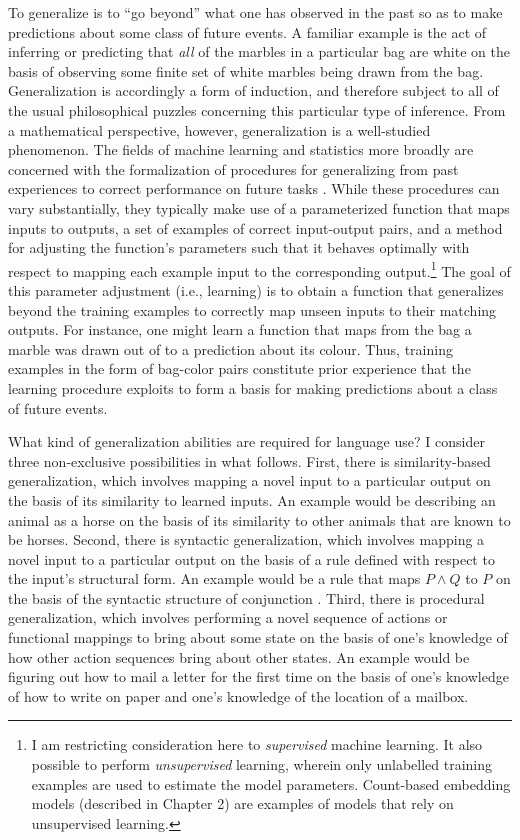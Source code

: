 To generalize is to ``go beyond'' what one has observed in the past so as to make predictions about some class of future events. A familiar example is the act of inferring or predicting that \textit{all} of the marbles in a particular bag are white on the basis of observing some finite set of white marbles being drawn from the bag. Generalization is accordingly a form of induction, and therefore subject to all of the usual philosophical puzzles concerning this particular type of inference. From a mathematical perspective, however, generalization is a well-studied phenomenon. The fields of machine learning and statistics more broadly are concerned with the formalization of procedures for generalizing from past experiences to correct performance on future tasks \citep[][p. 6]{LiangPotts:2015}. While these procedures can vary substantially, they typically make use of a parameterized function that maps inputs to outputs, a set of examples of correct input-output pairs, and a method for adjusting the function's parameters such that it behaves optimally with respect to mapping each example input to the corresponding output.\footnote{I am restricting consideration here to \textit{supervised} machine learning. It also possible to perform \textit{unsupervised} learning, wherein only unlabelled training examples are used to estimate the model parameters. Count-based embedding models (described in Chapter 2) are examples of models that rely on unsupervised learning.} The goal of this parameter adjustment (i.e., learning) is to obtain a function that generalizes beyond the training examples to correctly map unseen inputs to their matching outputs. For instance, one might learn a function that maps from the bag a marble was drawn out of to a prediction about its colour. Thus, training examples in the form of bag-color pairs constitute prior experience that the learning procedure exploits to form a basis for making predictions about a class of future events. 

What kind of generalization abilities are required for language use? I consider three non-exclusive possibilities in what follows. First, there is similarity-based generalization, which involves mapping a novel input to a particular output on the basis of its similarity to learned inputs. An example would be describing an animal as a horse on the basis of its similarity to other animals that are known to be horses. Second, there is syntactic generalization, which involves mapping a novel input to a particular output on the basis of a rule defined with respect to the input's structural form. An example would be a rule that maps $P \land Q$ to $P$ on the basis of the syntactic structure of conjunction \citep{FodorPylyshyn:1988}. Third, there is procedural generalization, which involves performing a novel sequence of actions or functional mappings to bring about some state on the basis of one's knowledge of how other action sequences bring about other states. An example would be figuring out how to mail a letter for the first time on the basis of one's knowledge of how to write on paper and one's knowledge of the location of a mailbox. 

